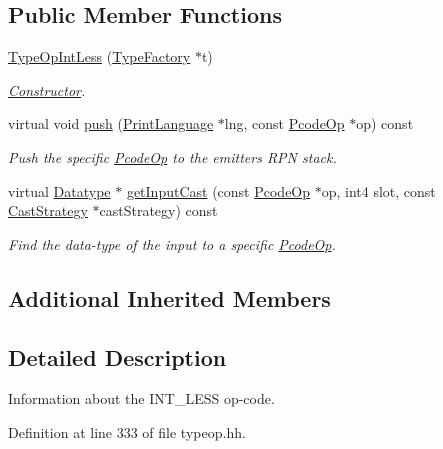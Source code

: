 \subsection*{Public Member Functions}
\begin{DoxyCompactItemize}
\item 
\mbox{\hyperlink{class_type_op_int_less_a5e7e922cbee4209939bada7c4bbb8858}{Type\+Op\+Int\+Less}} (\mbox{\hyperlink{class_type_factory}{Type\+Factory}} $\ast$t)
\begin{DoxyCompactList}\small\item\em \mbox{\hyperlink{class_constructor}{Constructor}}. \end{DoxyCompactList}\item 
virtual void \mbox{\hyperlink{class_type_op_int_less_a1703afcf7f8e027c4fda563be65aa785}{push}} (\mbox{\hyperlink{class_print_language}{Print\+Language}} $\ast$lng, const \mbox{\hyperlink{class_pcode_op}{Pcode\+Op}} $\ast$op) const
\begin{DoxyCompactList}\small\item\em Push the specific \mbox{\hyperlink{class_pcode_op}{Pcode\+Op}} to the emitter\textquotesingle{}s R\+PN stack. \end{DoxyCompactList}\item 
virtual \mbox{\hyperlink{class_datatype}{Datatype}} $\ast$ \mbox{\hyperlink{class_type_op_int_less_a9dedae62c7777cdcf4bbabbe440c510b}{get\+Input\+Cast}} (const \mbox{\hyperlink{class_pcode_op}{Pcode\+Op}} $\ast$op, int4 slot, const \mbox{\hyperlink{class_cast_strategy}{Cast\+Strategy}} $\ast$cast\+Strategy) const
\begin{DoxyCompactList}\small\item\em Find the data-\/type of the input to a specific \mbox{\hyperlink{class_pcode_op}{Pcode\+Op}}. \end{DoxyCompactList}\end{DoxyCompactItemize}
\subsection*{Additional Inherited Members}


\subsection{Detailed Description}
Information about the I\+N\+T\+\_\+\+L\+E\+SS op-\/code. 

Definition at line 333 of file typeop.\+hh.



